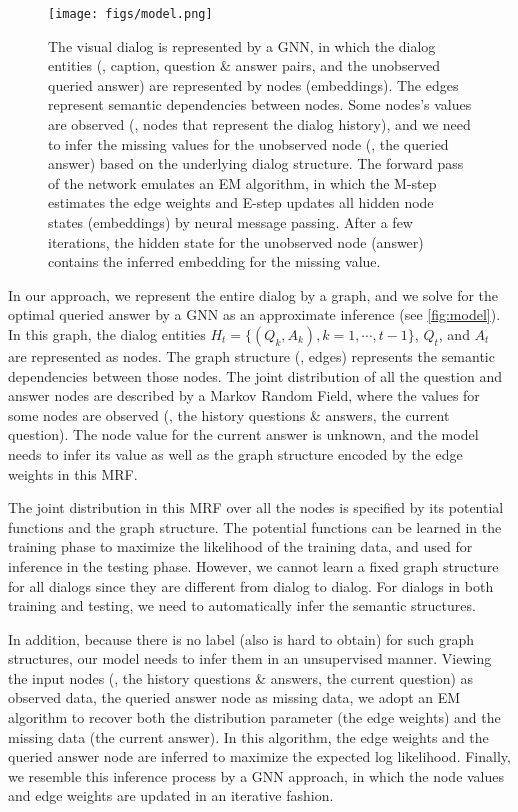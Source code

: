 \documentclass[10pt,twocolumn,letterpaper]{article}
\begin{document}
\begin{figure*}[t]
\centering
      \texttt{[image: figs/model.png]}
\caption{\small The visual dialog is represented by a GNN, in which the dialog entities (\ie, caption, question \& answer pairs, and the unobserved queried answer) are represented by nodes (embeddings). The edges represent semantic dependencies between nodes.
Some nodes's values are observed (\ie, nodes that represent the dialog history), and we need to infer the missing values for the unobserved node (\ie, the queried answer) based on the underlying dialog structure.
The forward pass of the network emulates an EM algorithm, in which the M-step estimates the edge weights and E-step updates all hidden node states (embeddings) by neural message passing. After a few iterations, the hidden state for the unobserved node (answer) contains the inferred embedding for the missing value.}
\label{fig:model}
\vspace{-12pt}
\end{figure*}

In our approach, we represent the entire dialog by a graph, and we solve for the optimal queried answer by a GNN as an approximate inference (see \autoref{fig:model}). In this graph, the dialog entities $H_t\!=\!\{(Q_k, A_k), k\!=\!1,\cdots,t\!-\!1\}$, $Q_t$, and $A_t$ are represented as nodes. The graph structure (\ie, edges) represents the semantic dependencies between those nodes. The joint distribution of all the question and answer nodes are described by a Markov Random Field, where the values for some nodes are observed (\ie, the history questions \& answers, the current question). The node value for the current answer is unknown, and the model needs to infer its value as well as the graph structure encoded by the edge weights in this MRF.

The joint distribution in this MRF over all the nodes is specified by its potential functions and the graph structure. The potential functions can be learned in the training phase to maximize the likelihood of the training data, and used for inference in the testing phase. However, we cannot learn a fixed graph structure for all dialogs since they are different from dialog to dialog. For dialogs in both training and testing, we need to automatically infer the semantic structures.

In addition, because there is no label (also is hard to obtain) for such graph structures, our model needs to infer them in an unsupervised manner. Viewing the input nodes (\ie, the history questions \& answers, the current question) as observed data, the queried answer node as missing data, we adopt an EM algorithm to recover both the distribution parameter (the edge weights) and the missing data (the current answer). In this algorithm, the edge weights and the queried answer node are inferred to maximize the expected log likelihood. Finally, we resemble this inference process by a GNN approach, in which the node values and edge weights are updated in an iterative fashion.
\end{document}
